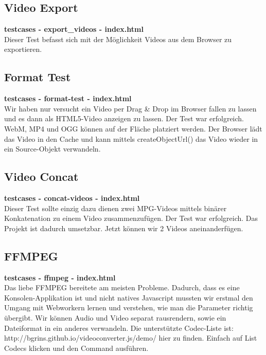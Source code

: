 \documentclass[a4paper,10pt]{scrartcl}
\begin{document}
\subsection{Video Export}
\textbf{testcases - export\_videos - index.html} \\
Dieser Test befasst sich mit der Möglichkeit Videos aus dem Browser zu exportieren.
\subsection{Format Test}
\textbf{testcases - format-test - index.html} \\
Wir haben nur versucht ein Video per Drag \& Drop im Browser fallen zu lassen und es dann als HTML5-Video anzeigen zu lassen. Der Test war erfolgreich. WebM, MP4 und OGG können auf der Fläche platziert werden. Der Browser lädt das Video in den Cache und kann mittels createObjectUrl() das Video wieder in ein Source-Objekt verwandeln.
\newpage
\subsection{Video Concat}
\textbf{testcases - concat-videos - index.html} \\
Dieser Test sollte einzig dazu dienen zwei MPG-Videos mittels binärer Konkatenation zu einem Video zusammenzufügen. Der Test war erfolgreich. Das Projekt ist dadurch umsetzbar. Jetzt können wir 2 Videos aneinanderfügen. 
\subsection{FFMPEG}
\textbf{testcases - ffmpeg - index.html} \\
Das liebe FFMPEG bereitete am meisten Probleme. Dadurch, dass es eine Konsolen-Applikation ist und nicht natives Javascript mussten wir erstmal den Umgang mit Webworkern lernen und verstehen, wie man die Parameter richtig übergibt. Wir können Audio und Video separat rausrendern, sowie ein Dateiformat in ein anderes verwandeln. Die unterstützte Codec-Liste ist: http://bgrins.github.io/videoconverter.js/demo/ hier zu finden. Einfach auf List Codecs klicken und den Command ausführen.
\newpage
\end{document}
